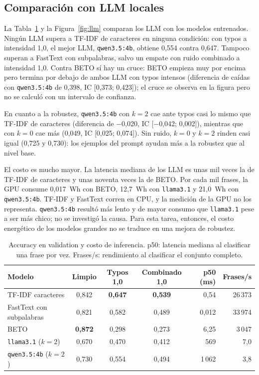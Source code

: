\documentclass[11pt,a4paper]{article}
\newcommand{\cod}[1]{\texttt{#1}}
\begin{document}
\subsection{Comparación con LLM locales}
\label{sec:llm}

La Tabla~\ref{tab:llm} y la Figura~\ref{fig:llm} comparan los LLM con los modelos entrenados.
Ningún LLM supera a TF-IDF de caracteres en ninguna condición: con typos a intensidad 1,0,
el mejor LLM, \cod{qwen3.5:4b}, obtiene 0,554 contra 0,647. Tampoco superan a FastText con
subpalabras, salvo un empate con ruido combinado a intensidad 1,0. Contra BETO sí hay un
cruce: BETO empieza muy por encima pero termina por debajo de ambos LLM con typos intensos
(diferencia de caídas con \cod{qwen3.5:4b} de 0,398, IC [0,373; 0,423]); el cruce se observa
en la figura pero no se calculó con un intervalo de confianza.

En cuanto a la robustez, \cod{qwen3.5:4b} con $k=2$ cae ante typos casi lo mismo que TF-IDF de
caracteres (diferencia de $-$0,020, IC [$-$0,042; 0,002]), mientras que con $k=0$ cae más
(0,049, IC [0,025; 0,074]). Sin ruido, $k=0$ y $k=2$ rinden casi igual (0,725 y 0,730): los
ejemplos del prompt ayudan más a la robustez que al nivel base.

El costo es mucho mayor. La latencia mediana de los LLM es unas mil veces la de TF-IDF de
caracteres y unas noventa veces la de BETO. Por cada mil frases, la GPU consume 0,017~Wh con
BETO, 12,7~Wh con \cod{llama3.1} y 21,0~Wh con \cod{qwen3.5:4b}. TF-IDF y FastText corren en
CPU, y la medición de la GPU no los representa. \cod{qwen3.5:4b} resultó más lento y de mayor
consumo que \cod{llama3.1} pese a ser más chico; no se investigó la causa. Para esta tarea,
entonces, el costo energético de los modelos grandes
no se traduce en una mejora de robustez.

\begin{table}[H]
\centering
\small
\begin{tabular}{@{}l c c c r r@{}}
\toprule
Modelo & Limpio & Typos 1,0 & Combinado 1,0 & p50 (ms) & Frases/s \\
\midrule
TF-IDF caracteres & 0,842 & \textbf{0,647} & \textbf{0,539} & 0,54 & 26\,373 \\
FastText con subpalabras & 0,821 & 0,582 & 0,489 & 0,012 & 33\,974 \\
BETO & \textbf{0,872} & 0,298 & 0,273 & 6,25 & 3\,047 \\
\cod{llama3.1} ($k=2$) & 0,670 & 0,470 & 0,412 & 569 & 7,0 \\
\cod{qwen3.5:4b} ($k=2$) & 0,730 & 0,554 & 0,494 & 1\,062 & 3,8 \\
\bottomrule
\end{tabular}
\caption{Accuracy en validation y costo de inferencia. p50: latencia mediana al clasificar una
frase por vez. Frases/s: rendimiento al clasificar el conjunto completo.}
\label{tab:llm}
\end{table}
\end{document}
